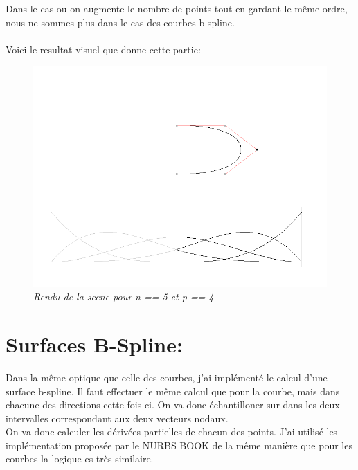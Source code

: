 \documentclass[12pt,letterpaper]{article}
\begin{document}
	Dans le cas ou on augmente le nombre de points tout en gardant le même ordre, nous ne sommes plus dans le cas des courbes b-spline.\\\\
	Voici le resultat visuel que donne cette partie:
	\newpage
\begin{figure}[h!]
	\centering
	\includegraphics[scale=0.3]{images/img2.png}
	\caption{\textit{Rendu de la scene pour n == 5 et p == 4}}
\end{figure}
\section{Surfaces B-Spline:}
	\setlength{\parindent}{1cm}
	Dans la même optique que celle des courbes, j'ai implémenté le calcul d'une surface b-spline. Il faut effectuer le même calcul que pour la courbe, mais dans chacune des directions cette fois ci. On va donc échantilloner sur dans les deux intervalles correspondant aux deux vecteurs nodaux.\\
	
	On va donc calculer les dérivées partielles de chacun des points. J'ai utilisé les implémentation proposée par le NURBS BOOK de la même manière que pour les courbes la logique es très similaire.\\
	
\end{document}
